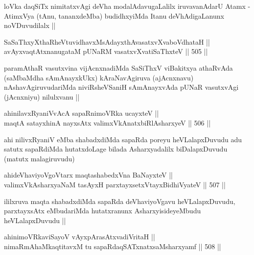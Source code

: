 \begin{artha}
loVka daqSiTx nimitatxvAgi deVha modalAdavugaLalilx iruvavanAdarU
Atamx - AtimxVya (tAnu, tananxdeMba) budidhxyiMda Itanu
deVhAdigaLanunx noVDuvudilalx ||
\end{artha}


\begin{shl}
SaSaThxyXthaRheVtuvidhavxMsAdayxthAvasatxvXvaboVdhataH || \\
avAyxvaqtAtxnanugataM pUNaRM vasatxvXvatiSaThxteV ||  505 ||  
\end{shl}

\begin{artha}
paramAthaR vasutxvina vijAcnxnadiMda SaSiThxV viBakitxya athaRvAda
(saMbaMdha sAmAnayxkUkx) kAraNavAgiruva (ajAcnxnavu)
nAshavAgiruvudariMda niviRsheVSaniH sAmAnayxvAda pUNaR vasutxvAgi
(jAcnxniyu) nilulxvanu ||
\end{artha}


\stext


\begin{shl}
ahinilavxRyaniVvAcA sapaRnimoVRka ucayxteV || \\
maqtA satayxhinA nayxsAtx valimxVkAnatxbiRlAsharxyeV ||  506 ||  
\end{shl}

\begin{artha}
ahi nilivxRyaniV eMba shabadxdiMda sapaRda poreyu heVLalapxDuvudu adu
satutx sapaRdiMda hutatxdoLage bilada Asharxyadalilx biDalapxDuvudu
(matutx malagiruvudu) 
\end{artha}

\begin{shl}
ahideVhaviyoVgoV\s tarx maqtashabedxVna BaNayxteV || \\
valimxVkAsharxyaNaM tasAyxH parxtayxsetxVtayxBidhiVyateV ||  507 ||  
\end{shl}

\begin{artha}
ililxruva maqta shabadxdiMda sapaRda deVhaviyoVgavu heVLalapxDuvudu,
parxtayxsAtx eMbudariMda hutatxranunx AsharxyisideyeMbudu
heVLalapxDuvudu ||
\end{artha}

\begin{shl}
ahinimoVRkaviSayoV vAyxpArasAtxvadiVritaH || \\
nimaRmAhaMkaqtitavxM tu sapaRdaqSATxnatxsaMsharxyamf ||  508 ||  
\end{shl}


